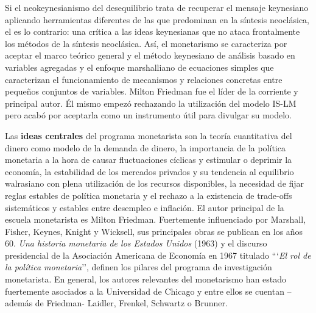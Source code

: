 \documentclass{nuevotema}
\begin{document}
Si el neokeynesianismo del desequilibrio trata de recuperar el mensaje keynesiano aplicando herramientas diferentes de las que predominan en la síntesis neoclásica, el  es lo contrario: una crítica a las ideas keynesianas que no ataca frontalmente los métodos de la síntesis neoclásica. Así, el monetarismo se caracteriza por aceptar el marco teórico general y el método keynesiano de análisis basado en variables agregadas y el enfoque marshalliano de ecuaciones simples que caracterizan el funcionamiento de mecanismos y relaciones concretas entre pequeños conjuntos de variables. Milton Friedman fue el líder de la corriente y principal autor. Él mismo empezó rechazando la utilización del modelo IS-LM pero acabó por aceptarla como un instrumento útil para divulgar su modelo.

Las \textbf{ideas centrales} del programa monetarista son la teoría cuantitativa del dinero como modelo de la demanda de dinero, la importancia de la política monetaria a la hora de causar fluctuaciones cíclicas y estimular o deprimir la economía, la estabilidad de los mercados privados y su tendencia al equilibrio walrasiano con plena utilización de los recursos disponibles, la necesidad de fijar reglas estables de política monetaria y el rechazo a la existencia de trade-offs sistemáticos y estables entre desempleo e inflación. El autor principal de la escuela monetarista es Milton Friedman. Fuertemente influenciado por Marshall, Fisher, Keynes, Knight y Wicksell, sus principales obras se publican en los años 60. \textit{Una historia monetaria de los Estados Unidos} (1963) y el discurso presidencial de la Asociación Americana de Economía en 1967 titulado ```\textit{El rol de la política monetaria}'', definen los pilares del programa de investigación  monetarista. En general, los autores relevantes del monetarismo han estado fuertemente asociados a la Universidad de Chicago y entre ellos se cuentan --además de Friedman- Laidler, Frenkel, Schwartz o Brunner.
\end{document}

